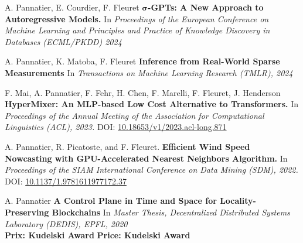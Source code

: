 \small
A. Pannatier, E. Courdier, F. Fleuret $\bm{\sigma}$\textbf{-GPTs: A New Approach to Autoregressive Models.} In \textit{Proceedings of the European Conference on Machine Learning and Principles and Practice of Knowledge Discovery in Databases (ECML/PKDD) 2024}
\commonvspace


A. Pannatier, K. Matoba, F. Fleuret \textbf{Inference from Real-World Sparse Measurements} In \textit{Transactions on Machine Learning Research (TMLR), 2024}
\commonvspace

F. Mai, A. Pannatier, F. Fehr, H. Chen, F. Marelli, F. Fleuret, J. Henderson \textbf{HyperMixer: An MLP-based Low Cost Alternative to Transformers.} In \textit{Proceedings of the Annual Meeting of the Association for Computational Linguistics (ACL), 2023.} DOI: \href{https://doi.org/10.18653/v1/2023.acl-long.871}{10.18653/v1/2023.acl-long.871}
\commonvspace

A. Pannatier, R. Picatoste, and F. Fleuret. \textbf{Efficient Wind Speed Nowcasting with GPU-Accelerated Nearest Neighbors Algorithm.} In \textit{Proceedings of the SIAM International Conference on Data Mining (SDM), 2022.} DOI: \href{https://doi.org/10.1137/1.9781611977172.37}{10.1137/1.9781611977172.37}
\commonvspace

A. Pannatier \textbf{A Control Plane in Time and Space for Locality-Preserving Blockchains} In \textit{Master Thesis, Decentralized Distributed Systems Laboratory (DEDIS), EPFL, 2020} \\
\ifFrench
  \textbf{Prix: Kudelski Award}
\else
  \textbf{Price: Kudelski Award}
\fi
\commonvspace